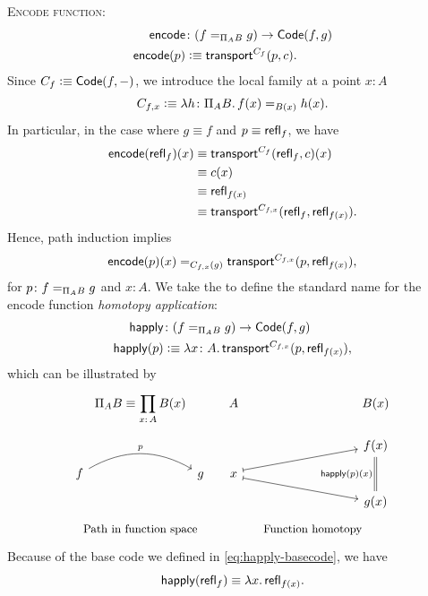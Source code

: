 \textsc{Encode function:}
\begin{align*}
    \fun{encode}&\colon(f\eq{\Pi_AB}g)\to\fun{Code}(f,g)\\
    \fun{encode}(p)&\defeq\fun{transport}^{C_f}(p,c).
\end{align*}
Since\/ $C_f\mathrel{\vcentcolon}\equiv\mathsf{Code}(f,{\mathord-})$, we introduce the local family at a point\/ $x\colon A$
\[
    C_{f,x}\defeq\lambda h\colon\Pi_AB.\, f(x)\eq{B(x)}h(x).
\]
In particular, in the case where\/ $g\equiv f$ and\/ $p\equiv\mathsf{refl}_f$, we have
\begin{align*}
    \mathsf{encode}(\mathsf{refl}_f)(x)
        &\equiv\mathsf{transport}^{C_f}(\mathsf{refl}_f,c)(x)\\
        &\equiv c(x)\\
        &\equiv\mathsf{refl}_{f(x)}\\
        &\equiv\mathsf{transport}^{C_{f,x}}
            (\mathsf{refl}_f,\mathsf{refl}_{f(x)}).
\end{align*}
Hence, path induction implies
\[
    \mathsf{encode}(p)(x)\mathrel{=_{C_{f,x}(g)}}
        \mathsf{transport}^{C_{f,x}}(p,\mathsf{refl}_{f(x)}),
\]
for $p\colon f\eq{\Pi_AB} g$ and $x\colon A$.
We take the \rhs to define the standard name for the encode function \textsl{homotopy application\/}:
\begin{equation}\label{eq:homotopy-application}
    \begin{aligned}
        \fun{happly}&\colon(f\eq{\Pi_AB} g)\to\fun{Code}(f,g)\\
        \fun{happly}(p)&\defeq \lambda x\colon A.\,
                \fun{transport}^{C_{f,x}}(p,\fun{refl}_{f(x)}),
    \end{aligned}
\end{equation}
which can be illustrated by
\[
\begin{tikzcd}[row sep=0.2cm,column sep=-0.3cm]
        &\displaystyle\Pi_AB\equiv\prod_{x\colon A}B(x)
        &&\qquad A
        &&B(x)\\
        &&&&&f(x)
            \arrow[dd,"\fun{happly}(p)(x)"',equal]\\
    f
            \arrow[rr,"p",bend left]
        &&g
        &\qquad x
            \arrow[rru,mapsto]
            \arrow[rrd,mapsto]&&\\
        &&&&&g(x)\\
        &\text{\small Path in function space}
        &&&\qquad\text{\small Function homotopy}
\end{tikzcd}
\]
Because of the base code we defined in \eqref{eq:happly-basecode}, we have
\begin{equation}\label{eq:happly-refl}
    \mathsf{happly}(\mathsf{refl}_f)\equiv\lambda x.\,\mathsf{refl}_{f(x)}.
\end{equation}

